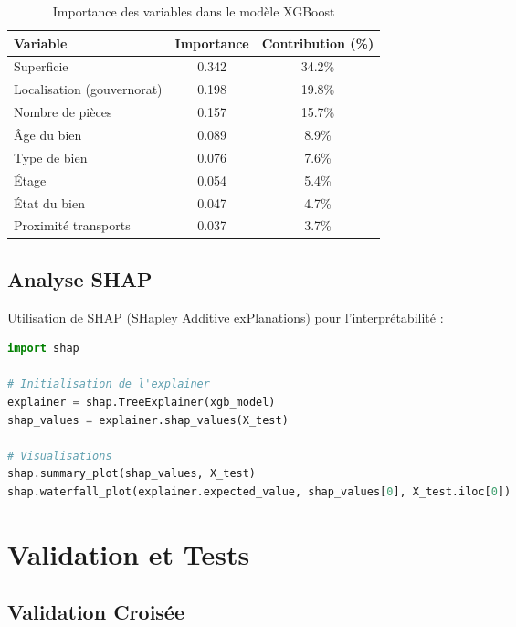 \begin{table}[H]
\centering
\caption{Importance des variables dans le modèle XGBoost}
\begin{tabular}{|l|c|c|}
\hline
\textbf{Variable} & \textbf{Importance} & \textbf{Contribution (\%)} \\
\hline
Superficie & 0.342 & 34.2\% \\
Localisation (gouvernorat) & 0.198 & 19.8\% \\
Nombre de pièces & 0.157 & 15.7\% \\
Âge du bien & 0.089 & 8.9\% \\
Type de bien & 0.076 & 7.6\% \\
Étage & 0.054 & 5.4\% \\
État du bien & 0.047 & 4.7\% \\
Proximité transports & 0.037 & 3.7\% \\
\hline
\end{tabular}
\label{tab:feature_importance}
\end{table}

\subsection{Analyse SHAP}

Utilisation de SHAP (SHapley Additive exPlanations) pour l'interprétabilité :

\begin{lstlisting}[language=Python, caption=Analyse SHAP]
import shap

# Initialisation de l'explainer
explainer = shap.TreeExplainer(xgb_model)
shap_values = explainer.shap_values(X_test)

# Visualisations
shap.summary_plot(shap_values, X_test)
shap.waterfall_plot(explainer.expected_value, shap_values[0], X_test.iloc[0])
\end{lstlisting}

\section{Validation et Tests}

\subsection{Validation Croisée}


